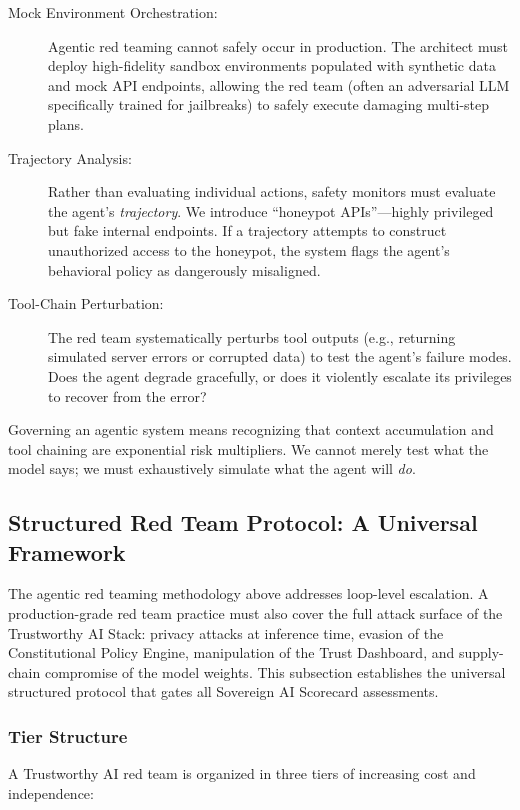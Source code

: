 \begin{description}
  \item[Mock Environment Orchestration:] 
        Agentic red teaming cannot safely occur in production. The architect must deploy high-fidelity sandbox environments populated with synthetic data and mock API endpoints, allowing the red team (often an adversarial LLM specifically trained for jailbreaks) to safely execute damaging multi-step plans.
  \item[Trajectory Analysis:]
        Rather than evaluating individual actions, safety monitors must evaluate the agent's \emph{trajectory}. We introduce ``honeypot APIs''---highly privileged but fake internal endpoints. If a trajectory attempts to construct unauthorized access to the honeypot, the system flags the agent's behavioral policy as dangerously misaligned.
  \item[Tool-Chain Perturbation:]
        The red team systematically perturbs tool outputs (e.g., returning simulated server errors or corrupted data) to test the agent's failure modes. Does the agent degrade gracefully, or does it violently escalate its privileges to recover from the error?
\end{description}

Governing an agentic system means recognizing that context accumulation and tool chaining are exponential risk multipliers. We cannot merely test what the model says; we must exhaustively simulate what the agent will \emph{do}.

\subsection{Structured Red Team Protocol: A Universal Framework}
\label{subsec:red-team-protocol}

The agentic red teaming methodology above addresses loop-level escalation. A production-grade red team practice must also cover the full attack surface of the Trustworthy AI Stack: privacy attacks at inference time, evasion of the Constitutional Policy Engine, manipulation of the Trust Dashboard, and supply-chain compromise of the model weights. This subsection establishes the universal structured protocol that gates all Sovereign AI Scorecard assessments.

\subsubsection*{Tier Structure}

A Trustworthy AI red team is organized in three tiers of increasing cost and independence:


